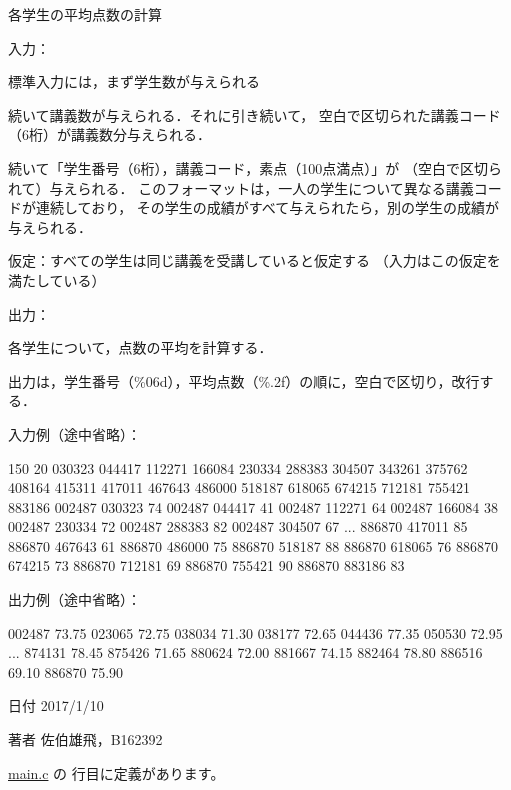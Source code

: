 各学生の平均点数の計算 

入力：
\begin{DoxyItemize}
\item 標準入力には，まず学生数が与えられる
\item 続いて講義数が与えられる．それに引き続いて， 空白で区切られた講義コード（6桁）が講義数分与えられる．
\item 続いて「学生番号（6桁），講義コード，素点（100点満点）」が （空白で区切られて）与えられる． このフォーマットは，一人の学生について異なる講義コードが連続しており， その学生の成績がすべて与えられたら，別の学生の成績が与えられる．
\item 仮定：すべての学生は同じ講義を受講していると仮定する （入力はこの仮定を満たしている）
\end{DoxyItemize}

出力：
\begin{DoxyItemize}
\item 各学生について，点数の平均を計算する．
\begin{DoxyItemize}
\item 出力は，学生番号（\%06d），平均点数（\%.2f）の順に，空白で区切り，改行する．
\end{DoxyItemize}
\end{DoxyItemize}

入力例（途中省略）： \begin{DoxyVerb}150
20
030323 044417 112271 166084 230334 288383 304507 343261 375762 408164 415311
417011 467643 486000 518187 618065 674215 712181 755421 883186
002487 030323 74
002487 044417 41
002487 112271 64
002487 166084 38
002487 230334 72
002487 288383 82
002487 304507 67
...
886870 417011 85
886870 467643 61
886870 486000 75
886870 518187 88
886870 618065 76
886870 674215 73
886870 712181 69
886870 755421 90
886870 883186 83
\end{DoxyVerb}
 出力例（途中省略）： \begin{DoxyVerb}002487 73.75
023065 72.75
038034 71.30
038177 72.65
044436 77.35
050530 72.95
...
874131 78.45
875426 71.65
880624 72.00
881667 74.15
882464 78.80
886516 69.10
886870 75.90
\end{DoxyVerb}
 \begin{DoxyDate}{日付}
2017/1/10 
\end{DoxyDate}
\begin{DoxyAuthor}{著者}
佐伯雄飛，\-B162392 
\end{DoxyAuthor}


 \hyperlink{main_8c_source}{main.\-c} の  行目に定義があります。



